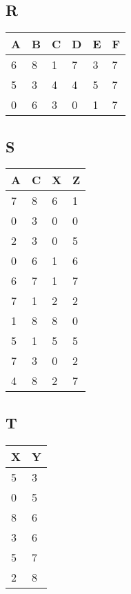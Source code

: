 \documentclass{lehramt-informatik}
\begin{document}
\begin{minipage}[t]{5cm}
\subsection*{R}
\begin{tabular}{llllll}
A & B & C & D & E & F \\\hline
6 & 8 & 1 & 7 & 3 & 7 \\
5 & 3 & 4 & 4 & 5 & 7 \\
0 & 6 & 3 & 0 & 1 & 7
\end{tabular}
\end{minipage}
%
\begin{minipage}[t]{3.8cm}
\subsection*{S}
\begin{tabular}{llll}
A & C & X & Z \\\hline
7 & 8 & 6 & 1 \\
0 & 3 & 0 & 0 \\
2 & 3 & 0 & 5 \\
0 & 6 & 1 & 6 \\
6 & 7 & 1 & 7 \\
7 & 1 & 2 & 2 \\
1 & 8 & 8 & 0 \\
5 & 1 & 5 & 5 \\
7 & 3 & 0 & 2 \\
4 & 8 & 2 & 7 \\
\end{tabular}
\end{minipage}
%
\begin{minipage}[t]{2cm}
\subsection*{T}
\begin{tabular}{ll}
X & Y \\\hline
5 & 3 \\
0 & 5 \\
8 & 6 \\
3 & 6 \\
5 & 7 \\
2 & 8 \\
\end{tabular}
\end{minipage}
\end{document}
